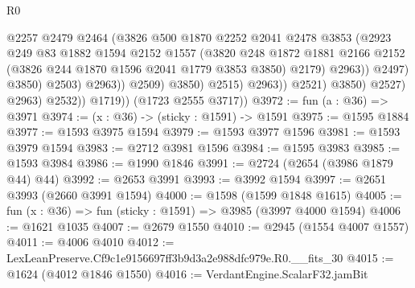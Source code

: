 \begin{lexlean}{R0}
\begin{coremodule}
                                          @2257
                                          @2479
                                          @2464
                                          (@3826
                                            @500
                                            @1870
                                            @2252
                                            @2041
                                            @2478
                                            @3853
                                            (@2923
                                              @249
                                              @83
                                              @1882
                                              @1594
                                              @2152
                                              @1557
                                              (@3820
                                                @248
                                                @1872
                                                @1881
                                                @2166
                                                @2152
                                                (@3826 @244 @1870 @1596 @2041 @1779 @3853 @3850)
                                                @2179)
                                              @2963))
                                          @2497)
                                        @3850)
                                      @2503)
                                    @2963))
                                @2509)
                              @3850)
                            @2515)
                          @2963))
                      @2521)
                    @3850)
                  @2527)
                @2963)
              @2532))
          @1719))
      (@1723 @2555 @3717))
@3972 := fun (a : @36) => @3971
@3974 := (x : @36) -> (sticky : @1591) -> @1591
@3975 := @1595 @1884
@3977 := @1593 @3975 @1594
@3979 := @1593 @3977 @1596
@3981 := @1593 @3979 @1594
@3983 := @2712 @3981 @1596
@3984 := @1595 @3983
@3985 := @1593 @3984
@3986 := @1990 @1846
@3991 := @2724 (@2654 (@3986 @1879 @44) @44)
@3992 := @2653 @3991
@3993 := @3992 @1594
@3997 := @2651 @3993 (@2660 @3991 @1594)
@4000 := @1598 (@1599 @1848 @1615)
@4005 := fun (x : @36) => fun (sticky : @1591) => @3985 (@3997 @4000 @1594)
@4006 := @1621 @1035
@4007 := @2679 @1550
@4010 := @2945 (@1554 @4007 @1557)
@4011 := @4006 @4010
@4012 := LexLeanPreserve.Cf9c1e9156697ff3b9d3a2e988dfc979e.R0.__fits_30
@4015 := @1624 (@4012 @1846 @1550)
@4016 := VerdantEngine.ScalarF32.jamBit

\end{coremodule}
\end{lexlean}
